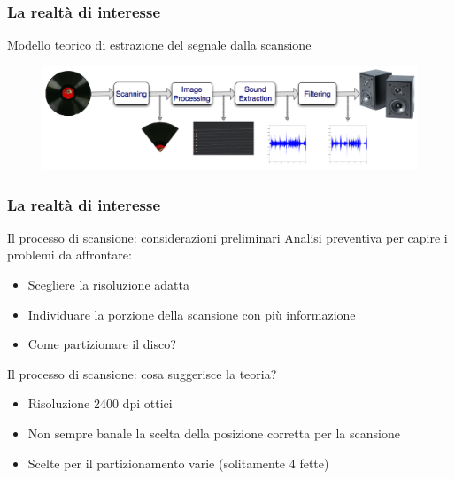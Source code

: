 \begin{frame}
\frametitle{La realtà di interesse}
\begin{block}{Modello teorico di estrazione del segnale dalla scansione}
\begin{figure}
\includegraphics[width=1\textwidth]{immagini/block-scheme.png}
\end{figure}
\end{block}
\end{frame}

\begin{frame}
\frametitle{La realtà di interesse}
\begin{block}{Il processo di scansione: considerazioni preliminari}
Analisi preventiva per capire i problemi da affrontare:
\begin{itemize}
\item Scegliere la risoluzione adatta
\item Individuare la porzione della scansione con più informazione
\item Come partizionare il disco?
\end{itemize}
\end{block}


\begin{block}{Il processo di scansione: cosa suggerisce la teoria?}
\begin{itemize}
\item Risoluzione 2400 dpi ottici
\item Non sempre banale la scelta della posizione corretta per la scansione
\item Scelte per il partizionamento varie (solitamente 4 fette)
\end{itemize}
\end{block}
\end{frame}

